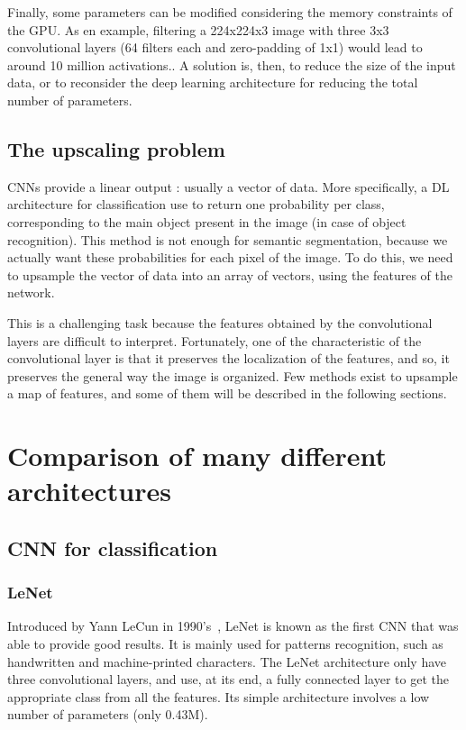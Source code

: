 Finally, some parameters can be modified considering the memory constraints of the GPU. As en example, filtering a 224x224x3 image with three 3x3 convolutional layers (64 filters each and zero-padding of 1x1) would lead to around 10 million activations.. A solution is, then, to reduce the size of the input data, or to reconsider the deep learning architecture for reducing the total number of parameters.


\subsection{The upscaling problem}
CNNs provide a linear output : usually a vector of data. More specifically, a DL architecture for classification use to return one probability per class, corresponding to the main object present in the image (in case of object recognition). This method is not enough for semantic segmentation, because we actually want these probabilities for each pixel of the image. To do this, we need to upsample the vector of data into an array of vectors, using the features of the network.

This is a challenging task because the features obtained by the convolutional layers are difficult to interpret. Fortunately, one of the characteristic of the convolutional layer is that it preserves the localization of the features, and so, it preserves the general way the image is organized. Few methods exist to upsample a map of features, and some of them will be described in the following sections.




\section{Comparison of many different architectures} \label{1:comparison}
\subsection{CNN for classification} \label{1:comparison:classification}
\subsubsection{LeNet} Introduced by Yann LeCun in 1990's~\cite{LECU98}, LeNet is known as the first CNN that was able to provide good results. It is mainly used for patterns recognition, such as handwritten and machine-printed characters. The LeNet architecture only have three convolutional layers, and use, at its end, a fully connected layer to get the appropriate class from all the features. Its simple architecture involves a low number of parameters (only 0.43M).


